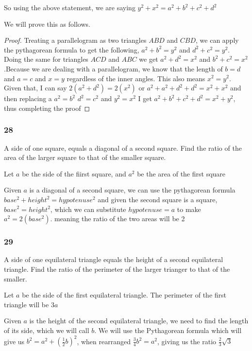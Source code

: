 \documentclass[]{report}
\begin{document}
	So using the above statement, we are saying $y^2 + x^2 = a^2 + b^2 + c^2 + d^2$
	
	
	We will prove this as follows.
	
	\begin{proof}
		Treating a parallelogram as two triangles $ABD$ and $CBD$, we can apply the pythagorean formula to get the following,
		$a^2 + b^2 = y^2$ and $d^2 + c^2 = y^2$. Doing the same for triangles $ACD$ and $ABC$ we get $a^2 + d^2 = x^2$ and $b^2 + c^2 = x^2$.Because we are dealing with a parallelogram, we know that the length of $b = d$ and $a = c$ and $x = y$ regardless of the inner angles. This also means $x^2 = y^2$. Given that, I can say $2(a^2 + d^2) = 2(x^2)$ or $a^2 + a^2 + d^2 + d^2 = x^2 + x^2$ and then replacing a $a^2 =  b^2$ $d^2 = c^2$ and $y^2 = x^2$ I get $a^2 + b^2 + c^2 + d^2 = x^2 + y^2$, thus completing the proof
	\end{proof}
\subsubsection{28}
A side of one square, equals a diagonal of a second square. Find the ratio of the area of the larger square to that of the smaller square. 

Let $a$ be the side of the fiirst square, and $a^2$ be the area of the first square

Given $a$ is a diagonal of a second square, we can use the pythagorean formula $base^2 + height^2 = hypotenuse^2$ and given the second square is a square, $base^2 = height^2$, which we can substitute $hypotenuse = a$ to make $a^2 = 2(base^2)$. meaning the ratio of the two areas will be 2

\subsubsection{29}
A side of one equilateral triangle equals the height of a second equilateral triangle. Find the ratio of the perimeter of the larger trianger to that of the smaller.

Let $a$ be the side of the first equilateral triangle. The perimeter of the first triangle will be $3a$

Given $a$ is the height of the second equilateral triangle, we need to find the length of its side, which we will call $b$. We will use the Pythagorean formula which will give us $b^2 = a^2 + (\frac{1}{2}b)^2$, when rearranged $\frac{3}{4}b^2 = a^2$, giving us the ratio $\frac{2}{3}\sqrt{3}$
\end{document}
